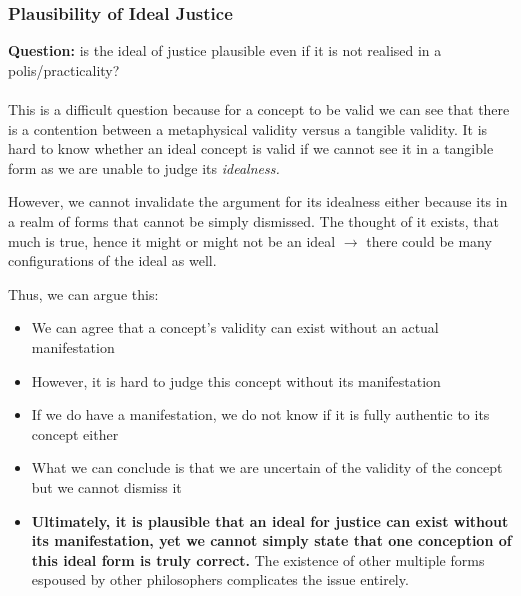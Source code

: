 \documentclass[12pt, letterpaper]{article}
\begin{document}
\subsubsection{Plausibility of Ideal Justice}
\textbf{Question:} is the ideal of justice plausible even if it is not realised in a polis/practicality?\\\\
This is a difficult question because for a concept to be valid we can see that there is a contention between a metaphysical validity versus a  tangible validity. It is hard to know whether an ideal concept is valid if we cannot see it in a tangible form as we are unable to judge its \textit{idealness.}

However, we cannot invalidate the argument for its idealness either because its in a realm of forms that cannot be simply dismissed. The thought of it exists, that much is true, hence it might or might not be an ideal $\rightarrow$ there could be many configurations of the ideal as well.

Thus, we can argue this:
\begin{itemize}
	\item We can agree that a concept's validity can exist without an actual manifestation
	\item However, it is hard to judge this concept without its manifestation
	\item If we do have a manifestation, we do not know if it is fully authentic to its concept either
	\item What we can conclude is that we are uncertain of the validity of the concept but we cannot dismiss it
	\item \textbf{Ultimately, it is plausible that an ideal for justice can exist without its manifestation, yet we cannot simply state that one conception of this ideal form is truly correct.} The existence of other multiple forms espoused by other philosophers complicates the issue entirely.
\end{itemize}
\end{document}
